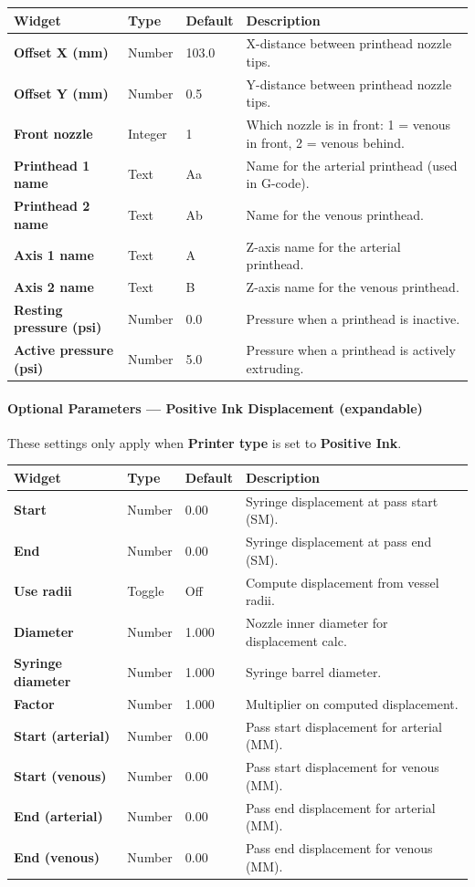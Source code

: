 \documentclass[11pt,letterpaper]{article}
\newcommand{\gui}[1]{\textcolor{guicolor}{\textsf{\textbf{#1}}}}
\begin{document}
\begin{longtable}{@{}L{3.8cm} l l L{4.5cm}@{}}
\toprule
\textbf{Widget} & \textbf{Type} & \textbf{Default} & \textbf{Description} \\
\midrule
\gui{Offset X (mm)} & Number & 103.0 & X-distance between printhead nozzle tips. \\
\gui{Offset Y (mm)} & Number & 0.5 & Y-distance between printhead nozzle tips. \\
\gui{Front nozzle} & Integer & 1 & Which nozzle is in front: 1 = venous in front, 2 = venous behind. \\
\gui{Printhead 1 name} & Text & Aa & Name for the arterial printhead (used in G-code). \\
\gui{Printhead 2 name} & Text & Ab & Name for the venous printhead. \\
\gui{Axis 1 name} & Text & A & Z-axis name for the arterial printhead. \\
\gui{Axis 2 name} & Text & B & Z-axis name for the venous printhead. \\
\gui{Resting pressure (psi)} & Number & 0.0 & Pressure when a printhead is inactive. \\
\gui{Active pressure (psi)} & Number & 5.0 & Pressure when a printhead is actively extruding. \\
\bottomrule
\end{longtable}

\paragraph{Optional Parameters --- Positive Ink Displacement (expandable)}

These settings only apply when \gui{Printer type} is set to \textbf{Positive Ink}.

\begin{longtable}{@{}L{3.8cm} l l L{4.5cm}@{}}
\toprule
\textbf{Widget} & \textbf{Type} & \textbf{Default} & \textbf{Description} \\
\midrule
\gui{Start} & Number & 0.00 & Syringe displacement at pass start (SM). \\
\gui{End} & Number & 0.00 & Syringe displacement at pass end (SM). \\
\gui{Use radii} & Toggle & Off & Compute displacement from vessel radii. \\
\gui{Diameter} & Number & 1.000 & Nozzle inner diameter for displacement calc. \\
\gui{Syringe diameter} & Number & 1.000 & Syringe barrel diameter. \\
\gui{Factor} & Number & 1.000 & Multiplier on computed displacement. \\
\gui{Start (arterial)} & Number & 0.00 & Pass start displacement for arterial (MM). \\
\gui{Start (venous)} & Number & 0.00 & Pass start displacement for venous (MM). \\
\gui{End (arterial)} & Number & 0.00 & Pass end displacement for arterial (MM). \\
\gui{End (venous)} & Number & 0.00 & Pass end displacement for venous (MM). \\
\bottomrule
\end{longtable}
\end{document}
